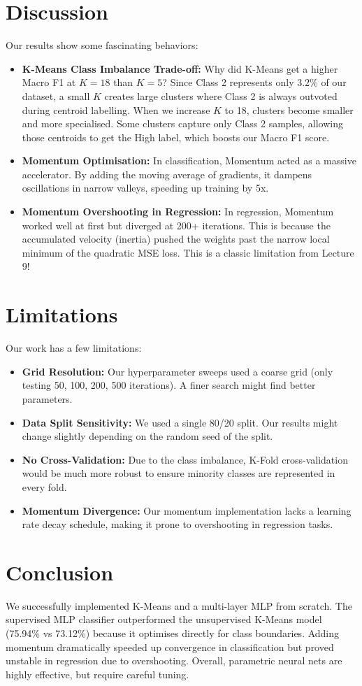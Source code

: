 \documentclass[10pt, twocolumn]{article}
\begin{document}
\section{Discussion}
Our results show some fascinating behaviors:
\begin{itemize}
    \setlength{\itemsep}{0pt}
    \setlength{\parskip}{0pt}
    \item \textbf{K-Means Class Imbalance Trade-off:} Why did K-Means get a higher Macro F1 at $K=18$ than $K=5$? Since Class 2 represents only 3.2\% of our dataset, a small $K$ creates large clusters where Class 2 is always outvoted during centroid labelling. When we increase $K$ to 18, clusters become smaller and more specialised. Some clusters capture only Class 2 samples, allowing those centroids to get the High label, which boosts our Macro F1 score.
    \item \textbf{Momentum Optimisation:} In classification, Momentum acted as a massive accelerator. By adding the moving average of gradients, it dampens oscillations in narrow valleys, speeding up training by 5x.
    \item \textbf{Momentum Overshooting in Regression:} In regression, Momentum worked well at first but diverged at 200+ iterations. This is because the accumulated velocity (inertia) pushed the weights past the narrow local minimum of the quadratic MSE loss. This is a classic limitation from Lecture 9!
\end{itemize}

\section{Limitations}
Our work has a few limitations:
\begin{itemize}
    \setlength{\itemsep}{0pt}
    \setlength{\parskip}{0pt}
    \item \textbf{Grid Resolution:} Our hyperparameter sweeps used a coarse grid (only testing 50, 100, 200, 500 iterations). A finer search might find better parameters.
    \item \textbf{Data Split Sensitivity:} We used a single 80/20 split. Our results might change slightly depending on the random seed of the split.
    \item \textbf{No Cross-Validation:} Due to the class imbalance, K-Fold cross-validation would be much more robust to ensure minority classes are represented in every fold.
    \item \textbf{Momentum Divergence:} Our momentum implementation lacks a learning rate decay schedule, making it prone to overshooting in regression tasks.
\end{itemize}

\section{Conclusion}
We successfully implemented K-Means and a multi-layer MLP from scratch. The supervised MLP classifier outperformed the unsupervised K-Means model (75.94\% vs 73.12\%) because it optimises directly for class boundaries. Adding momentum dramatically speeded up convergence in classification but proved unstable in regression due to overshooting. Overall, parametric neural nets are highly effective, but require careful tuning.
\end{document}

